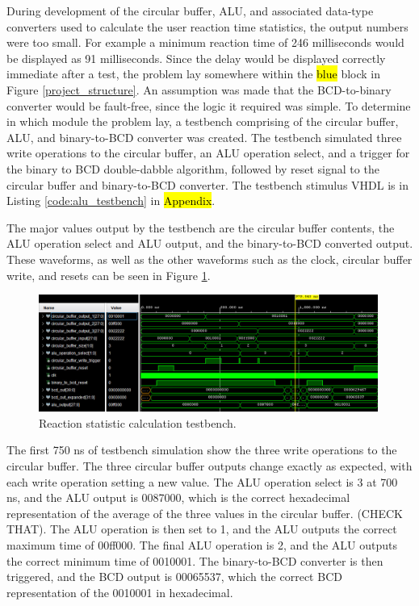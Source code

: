 \documentclass[11pt]{article}
\begin{document}

During development of the circular buffer, ALU, and associated data-type converters used to calculate the user reaction time statistics, the output numbers were too small. For example a minimum reaction time of 246 milliseconds would be displayed as 91 milliseconds. Since the delay would be displayed correctly immediate after a test, the problem lay somewhere within the \hl{blue} block in Figure \ref{project_structure}. An assumption was made that the BCD-to-binary converter would be fault-free, since the logic it required was simple. To determine in which module the problem lay, a testbench comprising of the circular buffer, ALU, and binary-to-BCD converter was created. The testbench simulated three write operations to the circular buffer, an ALU operation select, and a trigger for the binary to BCD double-dabble algorithm, followed by reset signal to the circular buffer and binary-to-BCD converter. The testbench stimulus VHDL is in Listing \ref{code:alu_testbench} in \hl{Appendix}.

The major values output by the testbench are the circular buffer contents, the ALU operation select and ALU output, and the binary-to-BCD converted output. These waveforms, as well as the other waveforms such as the clock, circular buffer write, and resets can be seen in Figure \ref{fig:alu_testbench}.

\begin{figure}[H]
  \centering
  \includegraphics[width=0.99\textwidth]{WhatsApp Image 2025-05-07 at 11.33.07.jpeg}
  \caption{Reaction statistic calculation testbench.}
  \label{fig:alu_testbench}
\end{figure}

The first 750 ns of testbench simulation show the three write operations to the circular buffer. The three circular buffer outputs change exactly as expected, with each write operation setting a new value. The ALU operation select is 3 at 700 ns, and the ALU output is 0087000, which is the correct hexadecimal representation of the average of the three values in the circular buffer. (CHECK THAT). The ALU operation is then set to 1, and the ALU outputs the correct maximum time of 00ff000. The final ALU operation is 2, and the ALU outputs the correct minimum time of 0010001. The binary-to-BCD converter is then triggered, and the BCD output is 00065537, which the correct BCD representation of the 0010001 in hexadecimal.
\end{document}
